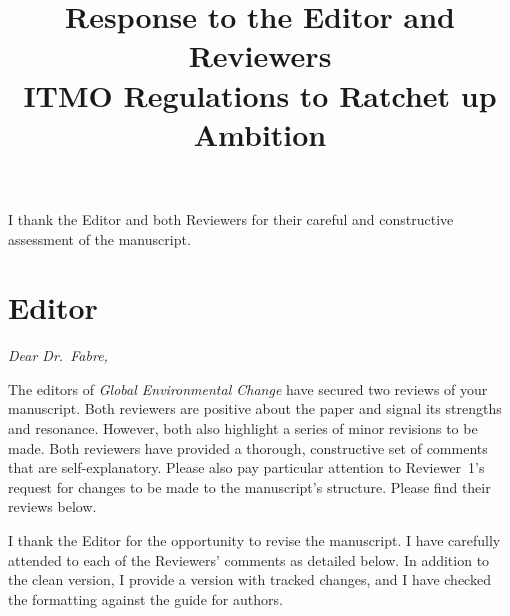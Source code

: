 \documentclass[11pt]{article}
\title{Response to the Editor and Reviewers\\[0.5em]
\large ITMO Regulations to Ratchet up Ambition}
\author{}
\date{}
\newenvironment{italic}{\itshape}{\par}
\begin{document}
\maketitle

\noindent I thank the Editor and both Reviewers for their careful and constructive assessment of the manuscript. %

\bigskip

\section*{Editor}

\begin{italic}
Dear Dr.\ Fabre,

The editors of \emph{Global Environmental Change} have secured two reviews of your manuscript. Both reviewers are positive about the paper and signal its strengths and resonance. However, both also highlight a series of minor revisions to be made. Both reviewers have provided a thorough, constructive set of comments that are self-explanatory. Please also pay particular attention to Reviewer~1's request for changes to be made to the manuscript's structure. Please find their reviews below.


\end{italic}



I thank the Editor for the opportunity to revise the manuscript. I have carefully attended to each of the Reviewers' comments as detailed below. In addition to the clean version, I provide a version with tracked changes, and I have checked the formatting against the guide for authors.
\end{document}

